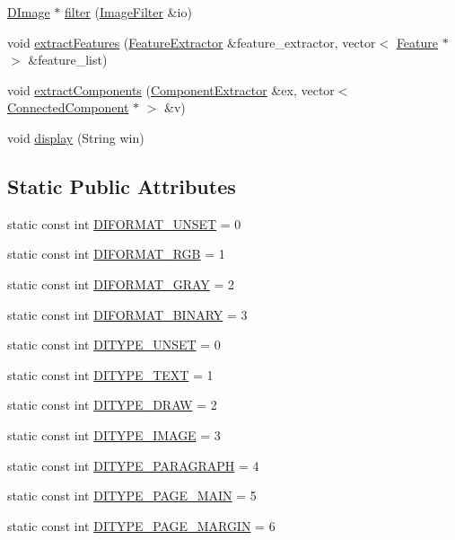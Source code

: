 \begin{DoxyCompactItemize}
\item 
\hyperlink{class_d_image}{D\+Image} $\ast$ \hyperlink{class_d_image_ae3bb096400bf85dc02ee93578696471b}{filter} (\hyperlink{class_image_filter}{Image\+Filter} \&io)
\item 
void \hyperlink{class_d_image_a644022c2f892f2087e2345faf9219930}{extract\+Features} (\hyperlink{class_feature_extractor}{Feature\+Extractor} \&feature\+\_\+extractor, vector$<$ \hyperlink{class_feature}{Feature} $\ast$ $>$ \&feature\+\_\+list)
\item 
void \hyperlink{class_d_image_a4a60efb2e91c9a07a4d8f37b9bc4d086}{extract\+Components} (\hyperlink{class_component_extractor}{Component\+Extractor} \&ex, vector$<$ \hyperlink{class_connected_component}{Connected\+Component} $\ast$ $>$ \&v)
\item 
void \hyperlink{class_d_image_a56a11350bd9375dfe95a62abc2f4f8f8}{display} (String win)
\end{DoxyCompactItemize}
\subsection*{Static Public Attributes}
\begin{DoxyCompactItemize}
\item 
static const int \hyperlink{class_d_image_a5329679c0199806b9951d0442ec292f5}{D\+I\+F\+O\+R\+M\+A\+T\+\_\+\+U\+N\+S\+E\+T} = 0
\item 
static const int \hyperlink{class_d_image_a16e31de8a97ada87e8a077f72ff297d1}{D\+I\+F\+O\+R\+M\+A\+T\+\_\+\+R\+G\+B} = 1
\item 
static const int \hyperlink{class_d_image_ac2aef108a618db6d3e04924510ba9f35}{D\+I\+F\+O\+R\+M\+A\+T\+\_\+\+G\+R\+A\+Y} = 2
\item 
static const int \hyperlink{class_d_image_adf32af60452b52eb59922c9bb5f87119}{D\+I\+F\+O\+R\+M\+A\+T\+\_\+\+B\+I\+N\+A\+R\+Y} = 3
\item 
static const int \hyperlink{class_d_image_abf8ff1b3f61e5a15641bc672eaa9922e}{D\+I\+T\+Y\+P\+E\+\_\+\+U\+N\+S\+E\+T} = 0
\item 
static const int \hyperlink{class_d_image_a6a2aac0adab6d13d6efadcd4c29de570}{D\+I\+T\+Y\+P\+E\+\_\+\+T\+E\+X\+T} = 1
\item 
static const int \hyperlink{class_d_image_ad447450c2077063fe5b87dc8c8ca4737}{D\+I\+T\+Y\+P\+E\+\_\+\+D\+R\+A\+W} = 2
\item 
static const int \hyperlink{class_d_image_aad14d2a044d95e2aa71709c3c8e60379}{D\+I\+T\+Y\+P\+E\+\_\+\+I\+M\+A\+G\+E} = 3
\item 
static const int \hyperlink{class_d_image_a64f62a4c2bfc5b73f14bbb32975353b4}{D\+I\+T\+Y\+P\+E\+\_\+\+P\+A\+R\+A\+G\+R\+A\+P\+H} = 4
\item 
static const int \hyperlink{class_d_image_ad7dc702b7df0b1929a0e36c6999d0f67}{D\+I\+T\+Y\+P\+E\+\_\+\+P\+A\+G\+E\+\_\+\+M\+A\+I\+N} = 5
\item 
static const int \hyperlink{class_d_image_adc0266fb6c72fad279ae7cef80c278dd}{D\+I\+T\+Y\+P\+E\+\_\+\+P\+A\+G\+E\+\_\+\+M\+A\+R\+G\+I\+N} = 6
\end{DoxyCompactItemize}



